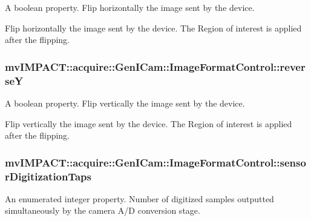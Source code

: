 A boolean property. Flip horizontally the image sent by the device. 

Flip horizontally the image sent by the device. The Region of interest is applied after the flipping. \hypertarget{classmv_i_m_p_a_c_t_1_1acquire_1_1_gen_i_cam_1_1_image_format_control_a5909e5548bb71e53b5d7d32d1e06c894}{
\subsubsection[{reverse\+Y}]{ mv\+I\+M\+P\+A\+C\+T\+::acquire\+::\+Gen\+I\+Cam\+::\+Image\+Format\+Control\+::reverse\+Y}}\label{classmv_i_m_p_a_c_t_1_1acquire_1_1_gen_i_cam_1_1_image_format_control_a5909e5548bb71e53b5d7d32d1e06c894}


A boolean property. Flip vertically the image sent by the device. 

Flip vertically the image sent by the device. The Region of interest is applied after the flipping. \hypertarget{classmv_i_m_p_a_c_t_1_1acquire_1_1_gen_i_cam_1_1_image_format_control_aaeaaa96bce4671d14b71656f65e52749}{
\subsubsection[{sensor\+Digitization\+Taps}]{ mv\+I\+M\+P\+A\+C\+T\+::acquire\+::\+Gen\+I\+Cam\+::\+Image\+Format\+Control\+::sensor\+Digitization\+Taps}}\label{classmv_i_m_p_a_c_t_1_1acquire_1_1_gen_i_cam_1_1_image_format_control_aaeaaa96bce4671d14b71656f65e52749}


An enumerated integer property. Number of digitized samples outputted simultaneously by the camera A/\+D conversion stage. 

